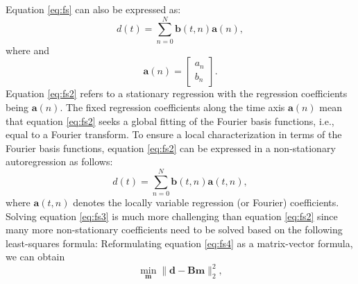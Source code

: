 Equation \ref{eq:fs} can also be expressed as:
\begin{equation}
\label{eq:fs2}
d(t) = \sum_{n=0}^{N} \mathbf{b}(t,n)\mathbf{a}(n),
\end{equation}
where
and
\begin{equation}
\label{eq:Mn}
\mathbf{a}(n)=\left[\begin{array}{c}
a_n \\
b_n
\end{array}\right].
\end{equation}
Equation \ref{eq:fs2} refers to a stationary regression with the regression coefficients being $\mathbf{a}(n)$. The fixed regression coefficients along the time axis $\mathbf{a}(n)$ mean that equation \ref{eq:fs2} seeks a global fitting of the Fourier basis functions, i.e., equal to a Fourier transform. To ensure a local characterization in terms of the Fourier basis functions, equation \ref{eq:fs2} can be expressed in a non-stationary autoregression  as follows:
\begin{equation}
\label{eq:fs3}
d(t) = \sum_{n=0}^{N} \mathbf{b}(t,n)\mathbf{a}(t,n),
\end{equation}
where $\mathbf{a}(t,n)$ denotes the locally variable regression (or Fourier) coefficients. Solving equation \ref{eq:fs3} is much more challenging than  equation \ref{eq:fs2} since many more non-stationary coefficients need to be solved based on the following least-squares formula:
 Reformulating equation \ref{eq:fs4} as a matrix-vector formula, we can obtain
\begin{equation}
\label{eq:fs44}
\min_{\mathbf{m}} \parallel \mathbf{d} -  \mathbf{B}\mathbf{m} \parallel_2^2,
\end{equation}
